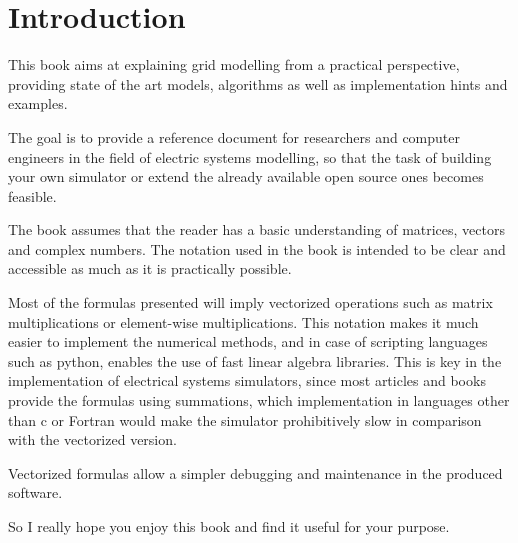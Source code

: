 \documentclass[a4paper,twoside,fleqn]{tufte-book}
\begin{document}
\tableofcontents

\listoffigures

\listoftables


\mainmatter
\chapter{Introduction}

This book aims at explaining grid modelling from a practical perspective, providing state of the art models, algorithms as well as implementation hints and examples.

The goal is to provide a reference document for researchers and computer engineers in the field of electric systems modelling, so that the task of building your own simulator or extend the already available open source ones becomes feasible.

The book assumes that the reader has a basic understanding of matrices, vectors and complex numbers. The notation used in the book is intended to be clear and accessible as much as it is practically possible.

Most of the formulas presented will imply vectorized operations such as matrix multiplications or element-wise multiplications. This notation makes it much easier to implement the numerical methods, and in case of scripting languages such as python, enables the use of fast linear algebra libraries. This is key in the implementation of electrical systems simulators, since most articles and books provide the formulas using summations, which implementation in languages other than c or Fortran would make the simulator prohibitively slow in comparison with the vectorized version.

Vectorized formulas allow a simpler debugging and maintenance in the produced software.

So I really hope you enjoy this book and find it useful for your purpose.

\end{document}

